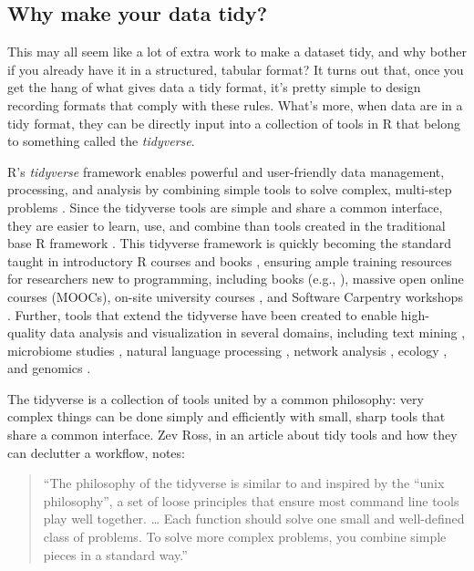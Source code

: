 \documentclass[]{tufte-book}
\begin{document}
\subsection{Why make your data tidy?}\label{why-make-your-data-tidy}

This may all seem like a lot of extra work to make a dataset tidy, and why
bother if you already have it in a structured, tabular format? It turns out
that, once you get the hang of what gives data a tidy format, it's pretty
simple to design recording formats that comply with these rules. What's more,
when data are in a tidy format, they can be directly input into a collection
of tools in R that belong to something called the \emph{tidyverse}.

R's \emph{tidyverse} framework enables powerful and user-friendly data management,
processing, and analysis by combining simple tools to solve complex, multi-step
problems \citep{ross2017declutter, silge2016tidytext, wickham2016ggplot2, wickham2016r}. Since the tidyverse tools are simple and share a common
interface, they are easier to learn, use, and combine than tools created in the
traditional base R framework \citep{ross2017declutter, lowndes2017our, mcnamara2016state}. This tidyverse framework is quickly becoming the standard
taught in introductory R courses and books \citep{hicks2017guide, baumer2015data, kaplan2018teaching, stander2017enthusing, mcnamara2016state}, ensuring ample training resources for researchers new to
programming, including books (e.g., \citep{baumer2017modern, lifesciencesR, wickham2016r}), massive open online courses (MOOCs), on-site university courses
\citep{baumer2015data, kaplan2018teaching, stander2017enthusing}, and Software
Carpentry workshops \citep{wilson2014software, pawlik2017developing}. Further, tools
that extend the tidyverse have been created to enable high-quality data
analysis and visualization in several domains, including text mining
\citep{silge2017text}, microbiome studies \citep{mcmurdie2013phyloseq}, natural language
processing \citep{RJ-2017-035}, network analysis \citep{RJ-2017-023}, ecology
\citep{hsieh2016inext}, and genomics \citep{yin2012ggbio}.

The tidyverse is a collection of tools united by a common philosophy: very complex
things can be done simply and efficiently with small, sharp tools that share a
common interface. Zev Ross, in an article about tidy tools and how they can
declutter a workflow, notes:

\begin{quote}
``The philosophy of the tidyverse is similar to
and inspired by the ``unix philosophy'', a set of loose principles that ensure
most command line tools play well together. \ldots{} Each function should solve one
small and well-defined class of problems. To solve more complex problems, you
combine simple pieces in a standard way.'' \citep{ross2017declutter}
\end{quote}
\end{document}
